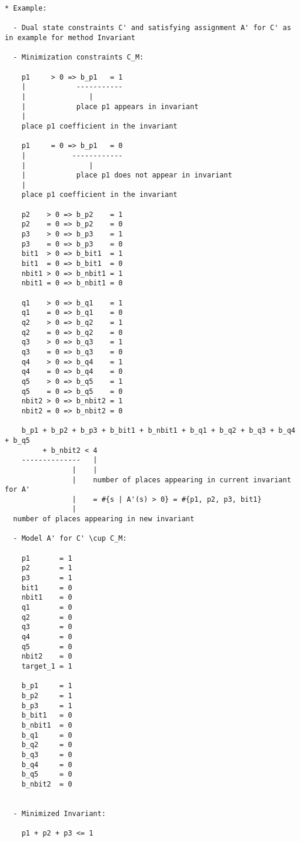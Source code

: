 \begin{verbatim}
* Example:

  - Dual state constraints C' and satisfying assignment A' for C' as in example for method Invariant

  - Minimization constraints C_M:

    p1     > 0 => b_p1   = 1
    |            -----------
    |               |
    |            place p1 appears in invariant
    |
    place p1 coefficient in the invariant

    p1     = 0 => b_p1   = 0
    |           ------------
    |               |
    |            place p1 does not appear in invariant
    |
    place p1 coefficient in the invariant

    p2    > 0 => b_p2    = 1
    p2    = 0 => b_p2    = 0
    p3    > 0 => b_p3    = 1
    p3    = 0 => b_p3    = 0
    bit1  > 0 => b_bit1  = 1
    bit1  = 0 => b_bit1  = 0
    nbit1 > 0 => b_nbit1 = 1
    nbit1 = 0 => b_nbit1 = 0

    q1    > 0 => b_q1    = 1
    q1    = 0 => b_q1    = 0
    q2    > 0 => b_q2    = 1
    q2    = 0 => b_q2    = 0
    q3    > 0 => b_q3    = 1
    q3    = 0 => b_q3    = 0
    q4    > 0 => b_q4    = 1
    q4    = 0 => b_q4    = 0
    q5    > 0 => b_q5    = 1
    q5    = 0 => b_q5    = 0
    nbit2 > 0 => b_nbit2 = 1
    nbit2 = 0 => b_nbit2 = 0

    b_p1 + b_p2 + b_p3 + b_bit1 + b_nbit1 + b_q1 + b_q2 + b_q3 + b_q4 + b_q5
         + b_nbit2 < 4
    --------------   |
                |    |
                |    number of places appearing in current invariant for A'
                |    = #{s | A'(s) > 0} = #{p1, p2, p3, bit1}
                |
  number of places appearing in new invariant
  
  - Model A' for C' \cup C_M:

    p1       = 1
    p2       = 1
    p3       = 1
    bit1     = 0
    nbit1    = 0
    q1       = 0
    q2       = 0
    q3       = 0
    q4       = 0
    q5       = 0
    nbit2    = 0
    target_1 = 1
    
    b_p1     = 1
    b_p2     = 1
    b_p3     = 1
    b_bit1   = 0
    b_nbit1  = 0
    b_q1     = 0
    b_q2     = 0
    b_q3     = 0
    b_q4     = 0
    b_q5     = 0
    b_nbit2  = 0
    
    
  - Minimized Invariant:

    p1 + p2 + p3 <= 1
\end{verbatim}
    
\newpage

